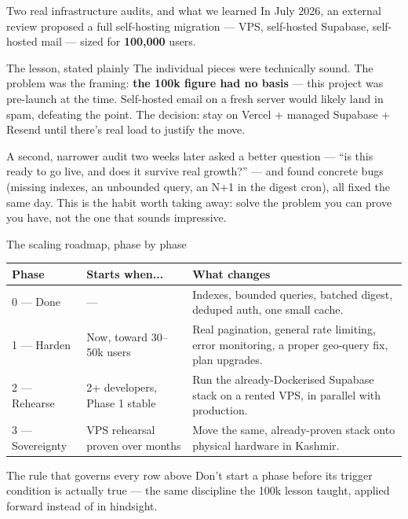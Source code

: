 \documentclass[aspectratio=169,11pt]{beamer}
\begin{document}
\begin{frame}{Two real infrastructure audits, and what we learned}
  In July 2026, an external review proposed a full self-hosting migration --- VPS, self-hosted Supabase, self-hosted mail --- sized for \textbf{100,000} users.
  \vspace{4pt}
  \begin{alertblock}{The lesson, stated plainly}
    The individual pieces were technically sound. The problem was the framing: \textbf{the 100k figure had no basis} --- this project was pre-launch at the time. Self-hosted email on a fresh server would likely land in spam, defeating the point. The decision: stay on Vercel + managed Supabase + Resend until there's real load to justify the move.
  \end{alertblock}
  A second, narrower audit two weeks later asked a better question --- ``is this ready to go live, and does it survive real growth?'' --- and found concrete bugs (missing indexes, an unbounded query, an N+1 in the digest cron), all fixed the same day.
  \vfill
  \small This is the habit worth taking away: solve the problem you can prove you have, not the one that sounds impressive.
\end{frame}

\begin{frame}{The scaling roadmap, phase by phase}
  \begin{center}
  \footnotesize
  \begin{tabular}{@{}p{1.6cm}p{3.0cm}p{7.6cm}@{}}
    \toprule
    \textbf{Phase} & \textbf{Starts when...} & \textbf{What changes} \\
    \midrule
    0 --- Done & --- & Indexes, bounded queries, batched digest, deduped auth, one small cache. \\
    1 --- Harden & Now, toward 30--50k users & Real pagination, general rate limiting, error monitoring, a proper geo-query fix, plan upgrades. \\
    2 --- Rehearse & 2+ developers, Phase 1 stable & Run the already-Dockerised Supabase stack on a rented VPS, in parallel with production. \\
    3 --- Sovereignty & VPS rehearsal proven over months & Move the same, already-proven stack onto physical hardware in Kashmir. \\
    \bottomrule
  \end{tabular}
  \end{center}
  \vfill
  \begin{alertblock}{The rule that governs every row above}
    Don't start a phase before its trigger condition is actually true --- the same discipline the 100k lesson taught, applied forward instead of in hindsight.
  \end{alertblock}
\end{frame}
\end{document}
